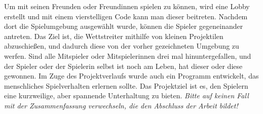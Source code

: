 Um mit seinen Freunden oder Freundinnen spielen zu können, wird eine Lobby erstellt und mit einem vierstelligen Code kann man dieser beitreten.
Nachdem dort die Spielumgebung ausgewählt wurde, können die Spieler gegeneinander antreten. 
Das Ziel ist, die Wettstreiter mithilfe von kleinen Projektilen abzuschießen, und dadurch diese von der vorher gezeichneten Umgebung zu werfen. 
Sind alle Mitspieler oder Mitspielerinnen drei mal hinuntergefallen, und der Spieler oder der Spielerin selbst ist noch am Leben, hat dieser oder diese gewonnen.
Im Zuge des Projektverlaufs wurde auch ein Programm entwickelt, das menschliches Spielverhalten erlernen sollte.
Das Projektziel ist es, den Spielern eine kurzweilige, aber spannende Unterhaltung zu bieten.
\emph{Bitte auf keinen Fall mit der Zusammenfassung verwechseln, die den Abschluss der Arbeit bildet!}
\lipsum[6]

